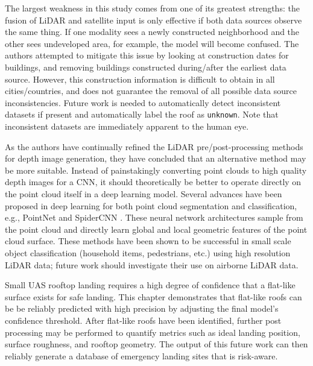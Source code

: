 The largest weakness in this study comes from one of its greatest strengths: the fusion of LiDAR and satellite input is only effective if both data sources observe the same thing.  If one modality sees a newly constructed neighborhood and the other sees undeveloped area, for example, the model will become confused. The authors attempted to mitigate this issue by looking at construction dates for buildings, and removing buildings constructed during/after the earliest data source. However, this construction information is difficult to obtain in all cities/countries, and does not guarantee the removal of all possible data source inconsistencies. Future work is needed to automatically detect inconsistent datasets if present and automatically label the roof as \texttt{unknown}.  Note that inconsistent datasets are immediately apparent to the human eye.

As the authors have continually refined the LiDAR pre/post-processing methods for depth image generation, they have concluded that an alternative method may be more suitable. Instead of painstakingly converting point clouds to high quality depth images for a \ac{CNN}, it should theoretically be better to operate directly on the point cloud itself in a deep learning model. Several advances have been proposed in deep learning for both point cloud segmentation and classification, e.g., PointNet and SpiderCNN \cite{qi_pointnet_2017-1, xu_spidercnn_2018}.  These neural network architectures sample from the point cloud and directly learn global and local geometric features of the point cloud surface. These methods have been shown to be successful in small scale object classification (household items, pedestrians, etc.) using high resolution LiDAR data; future work should investigate their use on airborne LiDAR data.

Small UAS rooftop landing requires a high degree of confidence that a flat-like surface exists for safe landing. This chapter demonstrates that flat-like roofs can be be reliably predicted with high precision by adjusting the final model's confidence threshold. After flat-like roofs have been identified, further post processing may be performed to quantify metrics such as ideal landing position, surface roughness, and rooftop geometry. The output of this future work can then reliably generate a database of emergency landing sites that is risk-aware.




